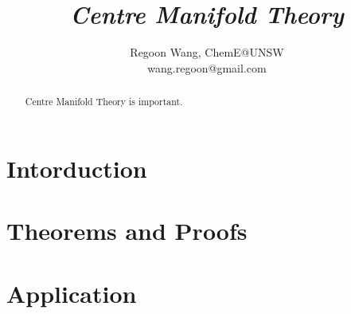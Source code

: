 \documentclass[12pt]{paper}
\begin{document}
 
\title{\textbf{\textit{Centre Manifold Theory}}}
\author{Regoon Wang, ChemE@UNSW \\ wang.regoon@gmail.com} 
\maketitle

\begin{abstract}
Centre Manifold Theory is important.
\end{abstract} 

\tableofcontents

\section{Intorduction}
\section{Theorems and Proofs}
\section{Application}
 
\end{document}
